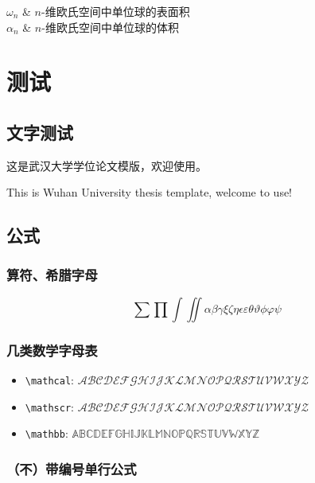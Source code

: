 \documentclass[type = master,class = academic]{whu-thesis}
\begin{document}
\tableofcontents

\begin{notation}
  $\omega_n$ & $n$-维欧氏空间中单位球的表面积 \\
  $\alpha_n$ & $n$-维欧氏空间中单位球的体积 \\
\end{notation}

\mainmatter

\chapter{测试}

\section{文字测试}

这是武汉大学学位论文模版，欢迎使用。

This is Wuhan University thesis template, welcome to use!

\section{公式}

\subsection{算符、希腊字母}

\[\sum\prod\int\iint\alpha\beta\gamma\xi\zeta\eta\epsilon\varepsilon\theta\vartheta
  \phi\varphi\psi\]


\subsection{几类数学字母表}

\begin{itemize}
  \item \verb|\mathcal|: $\mathcal{ABCDEFGHIJKLMNOPQRSTUVWXYZ}$
  \item \verb|\mathscr|: $\mathscr{ABCDEFGHIJKLMNOPQRSTUVWXYZ}$
  \item \verb|\mathbb|: $\mathbb{ABCDEFGHIJKLMNOPQRSTUVWXYZ}$
\end{itemize}


\subsection{（不）带编号单行公式}
\end{document}
